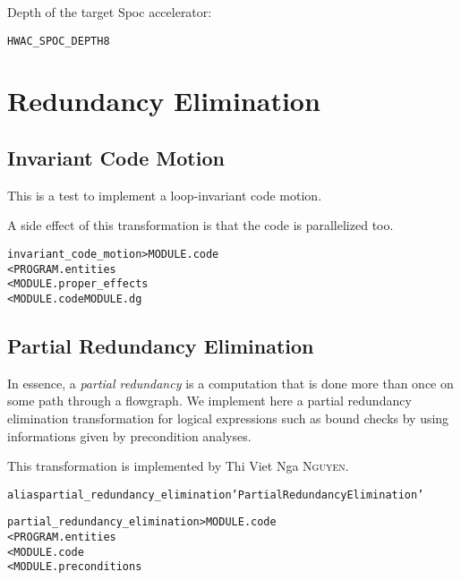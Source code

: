 \documentclass[a4paper]{report}
\newenvironment{PipsProp}{\begin{alltt}}{\end{alltt}}
\newenvironment{PipsMake}{\begin{alltt}}{\end{alltt}}
\begin{document}
Depth of the target Spoc accelerator:
\begin{PipsProp}
HWAC_SPOC_DEPTH 8
\end{PipsProp}



\section{Redundancy Elimination}

\subsection{Invariant Code Motion}
\label{subsection-invariant_code_motion}


This is a test to implement a loop-invariant code motion.

A side effect of this transformation is that the code is parallelized too.

\begin{PipsMake}
invariant_code_motion             > MODULE.code
        < PROGRAM.entities
        < MODULE.proper_effects
        < MODULE.code MODULE.dg
\end{PipsMake}


\subsection{Partial Redundancy Elimination}
\label{subsection-partial_redundancy_elimination}



In essence, a {\it partial redundancy} \cite{Much97} is a computation that is
done more than once on some path through a flowgraph. We implement here a
partial redundancy elimination transformation for logical
expressions such as bound checks by using informations given by
precondition analyses.

This transformation is implemented by Thi Viet Nga \textsc{Nguyen}.

\begin{PipsMake}

alias partial_redundancy_elimination 'Partial Redundancy Elimination'

partial_redundancy_elimination             > MODULE.code
        < PROGRAM.entities
        < MODULE.code
        < MODULE.preconditions
\end{PipsMake}
\end{document}
